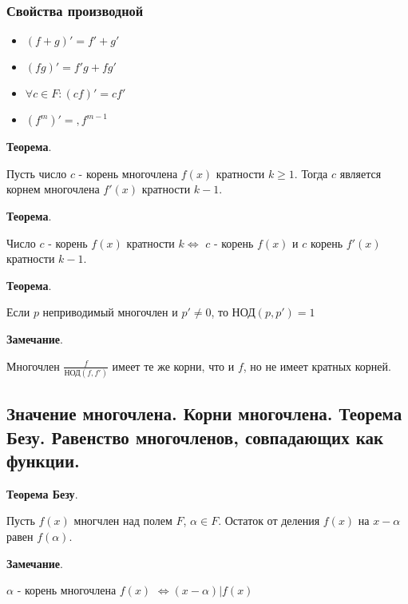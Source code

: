 \documentclass[a4paper]{article}
\begin{document}
\subsubsection*{Свойства производной}
\begin{itemize}
\item $(f+g)' = f'+g'$
\item $(fg)' = f'g+fg'$
\item $\forall c \in F: (cf)' = cf'$
\item $(f^m)' = ,f^{m-1}$
\end{itemize}

\begin{htheorem}\textbf{Теорема}.

Пусть число $c$ - корень многочлена $f(x)$ кратности $k \geq 1$. Тогда $c$ является корнем многочлена $f'(x)$ кратности $k-1$.
\end{htheorem}


\begin{htheorem}\textbf{Теорема}.

Число $c$ - корень $f(x)$ кратности $k \Leftrightarrow$ $c$ - корень $f(x)$ и $c$ корень $f'(x)$ кратности $k-1$.
\end{htheorem}

\begin{htheorem}\textbf{Теорема}.

Если $p$ неприводимый многочлен и $p' \neq 0$, то $\text{НОД}(p, p') = 1$
\end{htheorem}

\begin{htheorem}\textbf{Замечание}.

Многочлен $\frac{f}{\text{НОД}(f, f')}$ имеет те же корни, что и $f$, но не имеет кратных корней.
\end{htheorem}

\subsection*{Значение многочлена. Корни многочлена. Теорема Безу. Равенство многочленов, совпадающих как функции.}

\begin{htheorem}\textbf{Теорема Безу}.

Пусть $f(x)$ многчлен над полем $F$, $\alpha \in F$. Остаток  от деления $f(x)$ на $x-\alpha$ равен $f(\alpha)$.
\end{htheorem}

\begin{htheorem}\textbf{Замечание}.

$\alpha$ - корень многочлена $f(x)$ $\Leftrightarrow (x-\alpha) | f(x)$
\end{htheorem}
\end{document}
